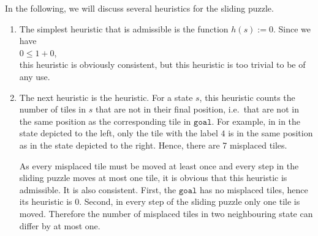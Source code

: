\examples
In the following, we will discuss several heuristics for the sliding puzzle.
\begin{enumerate}
\item The simplest heuristic that is admissible is the function $h(s) := 0$.  Since we have
      \\[0.2cm]
      \hspace*{1.3cm}
      $0 \leq 1 + 0$,
      \\[0.2cm]
      this heuristic is obviously consistent, but this heuristic is too trivial to be of any use.
\item The next heuristic is the  heuristic.  For a state $s$,
      this heuristic counts the number of tiles in $s$ that are not in their final position, i.e.~that are not
      in the same position as the corresponding tile in $\mathtt{goal}$.  For example, in 
      in the state depicted to the left, only the tile with the label $4$ is in the same
      position as in the state depicted to the right.  Hence, there are 7 misplaced tiles.

      As every misplaced tile must be moved at least once and every step in the sliding puzzle moves at most
      one tile, it is obvious that this heuristic is admissible.  It is also consistent.  First, the
      $\mathtt{goal}$ has no misplaced tiles, hence its heuristic is $0$.  Second, in every step of the sliding
      puzzle  only one tile is moved.  Therefore the number of misplaced tiles in two neighbouring state can
      differ by at most one.


\end{enumerate}
